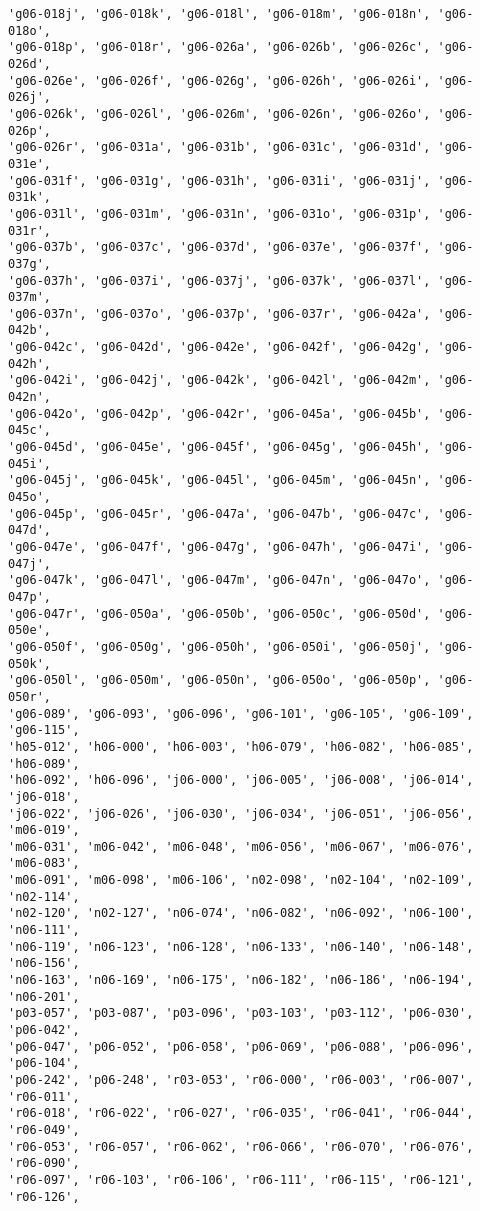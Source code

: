 \documentclass[11pt]{article}
\begin{document}
\begin{Verbatim}[commandchars=\\\{\}]
'g06-018j', 'g06-018k', 'g06-018l', 'g06-018m', 'g06-018n', 'g06-018o',
'g06-018p', 'g06-018r', 'g06-026a', 'g06-026b', 'g06-026c', 'g06-026d',
'g06-026e', 'g06-026f', 'g06-026g', 'g06-026h', 'g06-026i', 'g06-026j',
'g06-026k', 'g06-026l', 'g06-026m', 'g06-026n', 'g06-026o', 'g06-026p',
'g06-026r', 'g06-031a', 'g06-031b', 'g06-031c', 'g06-031d', 'g06-031e',
'g06-031f', 'g06-031g', 'g06-031h', 'g06-031i', 'g06-031j', 'g06-031k',
'g06-031l', 'g06-031m', 'g06-031n', 'g06-031o', 'g06-031p', 'g06-031r',
'g06-037b', 'g06-037c', 'g06-037d', 'g06-037e', 'g06-037f', 'g06-037g',
'g06-037h', 'g06-037i', 'g06-037j', 'g06-037k', 'g06-037l', 'g06-037m',
'g06-037n', 'g06-037o', 'g06-037p', 'g06-037r', 'g06-042a', 'g06-042b',
'g06-042c', 'g06-042d', 'g06-042e', 'g06-042f', 'g06-042g', 'g06-042h',
'g06-042i', 'g06-042j', 'g06-042k', 'g06-042l', 'g06-042m', 'g06-042n',
'g06-042o', 'g06-042p', 'g06-042r', 'g06-045a', 'g06-045b', 'g06-045c',
'g06-045d', 'g06-045e', 'g06-045f', 'g06-045g', 'g06-045h', 'g06-045i',
'g06-045j', 'g06-045k', 'g06-045l', 'g06-045m', 'g06-045n', 'g06-045o',
'g06-045p', 'g06-045r', 'g06-047a', 'g06-047b', 'g06-047c', 'g06-047d',
'g06-047e', 'g06-047f', 'g06-047g', 'g06-047h', 'g06-047i', 'g06-047j',
'g06-047k', 'g06-047l', 'g06-047m', 'g06-047n', 'g06-047o', 'g06-047p',
'g06-047r', 'g06-050a', 'g06-050b', 'g06-050c', 'g06-050d', 'g06-050e',
'g06-050f', 'g06-050g', 'g06-050h', 'g06-050i', 'g06-050j', 'g06-050k',
'g06-050l', 'g06-050m', 'g06-050n', 'g06-050o', 'g06-050p', 'g06-050r',
'g06-089', 'g06-093', 'g06-096', 'g06-101', 'g06-105', 'g06-109', 'g06-115',
'h05-012', 'h06-000', 'h06-003', 'h06-079', 'h06-082', 'h06-085', 'h06-089',
'h06-092', 'h06-096', 'j06-000', 'j06-005', 'j06-008', 'j06-014', 'j06-018',
'j06-022', 'j06-026', 'j06-030', 'j06-034', 'j06-051', 'j06-056', 'm06-019',
'm06-031', 'm06-042', 'm06-048', 'm06-056', 'm06-067', 'm06-076', 'm06-083',
'm06-091', 'm06-098', 'm06-106', 'n02-098', 'n02-104', 'n02-109', 'n02-114',
'n02-120', 'n02-127', 'n06-074', 'n06-082', 'n06-092', 'n06-100', 'n06-111',
'n06-119', 'n06-123', 'n06-128', 'n06-133', 'n06-140', 'n06-148', 'n06-156',
'n06-163', 'n06-169', 'n06-175', 'n06-182', 'n06-186', 'n06-194', 'n06-201',
'p03-057', 'p03-087', 'p03-096', 'p03-103', 'p03-112', 'p06-030', 'p06-042',
'p06-047', 'p06-052', 'p06-058', 'p06-069', 'p06-088', 'p06-096', 'p06-104',
'p06-242', 'p06-248', 'r03-053', 'r06-000', 'r06-003', 'r06-007', 'r06-011',
'r06-018', 'r06-022', 'r06-027', 'r06-035', 'r06-041', 'r06-044', 'r06-049',
'r06-053', 'r06-057', 'r06-062', 'r06-066', 'r06-070', 'r06-076', 'r06-090',
'r06-097', 'r06-103', 'r06-106', 'r06-111', 'r06-115', 'r06-121', 'r06-126',

\end{Verbatim}
\end{document}
